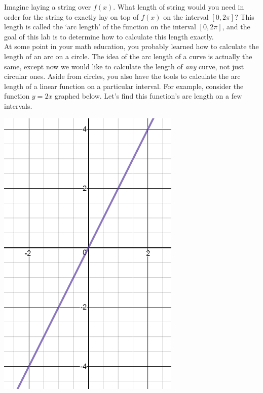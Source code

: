 \documentclass[handout,nooutcomes]{ximera}
\begin{document}
Imagine laying a string over $f(x)$.  What length of string would you need in order for the string to exactly lay on top of $f(x)$ on the interval $[0, 2\pi]$?  This length is called the `arc length' of the function on the interval $[0, 2\pi]$, and the goal of this lab is to determine how to calculate this length exactly.  \\

At some point in your math education, you probably learned how to calculate the length of an arc on a circle.  The idea of the arc length of a curve is actually the same, except now we would like to calculate the length of \textit{any} curve, not just circular ones.  Aside from circles, you also have the tools to calculate the arc length of a linear function on a particular interval.  For example, consider the function $y = 2x$ graphed below.  Let's find this function's arc length on a few intervals.  

\begin{center} \includegraphics{2x.png} \end{center}
\end{document}
